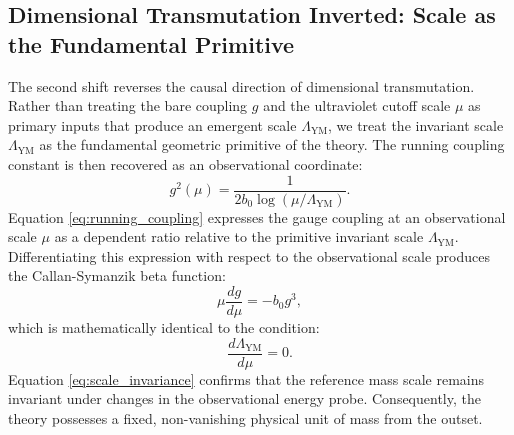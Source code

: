 \documentclass[11pt,reqno]{amsart}
\theoremstyle{plain}
\theoremstyle{definition}
\theoremstyle{remark}
\numberwithin{equation}{section}
\begin{document}
\subsection{Dimensional Transmutation Inverted: Scale as the Fundamental Primitive}
The second shift reverses the causal direction of dimensional transmutation. Rather than treating the bare coupling $g$ and the ultraviolet cutoff scale $\mu$ as primary inputs that produce an emergent scale $\Lambda_{\mathrm{YM}}$, we treat the invariant scale $\Lambda_{\mathrm{YM}}$ as the fundamental geometric primitive of the theory. The running coupling constant is then recovered as an observational coordinate:
\begin{equation}
\label{eq:running_coupling}
g^2(\mu) = \frac{1}{2 b_0 \log(\mu / \Lambda_{\mathrm{YM}})}.
\end{equation}
Equation \eqref{eq:running_coupling} expresses the gauge coupling at an observational scale $\mu$ as a dependent ratio relative to the primitive invariant scale $\Lambda_{\mathrm{YM}}$. Differentiating this expression with respect to the observational scale produces the Callan-Symanzik beta function:
\begin{equation}
\label{eq:callan_symanzik}
\mu \frac{d g}{d \mu} = - b_0 g^3,
\end{equation}
which is mathematically identical to the condition:
\begin{equation}
\label{eq:scale_invariance}
\frac{d \Lambda_{\mathrm{YM}}}{d \mu} = 0.
\end{equation}
Equation \eqref{eq:scale_invariance} confirms that the reference mass scale remains invariant under changes in the observational energy probe. Consequently, the theory possesses a fixed, non-vanishing physical unit of mass from the outset.
\end{document}
